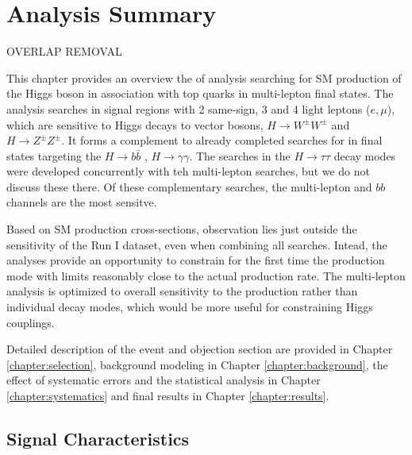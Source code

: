 \chapter[Analysis Summary][Analysis Summary]{Analysis Summary}
\label{chapter:analysis} 
OVERLAP REMOVAL

This chapter provides an overview the of analysis searching for SM
production of the Higgs boson in association with top quarks in
multi-lepton final states. The analysis searches in signal regions
with 2 same-sign, 3 and 4 light leptons ($e, \mu$), which are sensitive to Higgs
decays to vector bosons, $H\rightarrow W^{\pm}W^{\pm}$ and $H\rightarrow
Z^{\pm}Z^{\pm}$. It forms a complement to already completed searches for in
final states targeting the $H\rightarrow b\bar{b}$ \cite{Aad:2014lma},
$H\rightarrow\gamma\gamma$\cite{ATLAS-CONF-2014-011}. The \tth searches
in the $H\rightarrow\tau\tau$ decay modes were developed concurrently with teh 
multi-lepton searches, but we do not discuss these there. 
Of these complementary searches, the multi-lepton and $bb$ channels are the most sensitve. 

Based on SM production cross-sections, observation lies just outside the sensitivity
of the Run I dataset, even when combining all searches. Intead, the analyses provide an opportunity to 
constrain for the first time the \tth production mode with limits reasonably close to the
actual production rate. The multi-lepton analysis is optimized to overall sensitivity to the 
\tth production rather than individual decay modes, which would be more useful for
constraining Higgs couplings. 

Detailed description of the event and objection section are provided in Chapter \ref{chapter:selection},
background modeling in Chapter \ref{chapter:background}, the effect of systematic errors and the 
statistical analysis in Chapter \ref{chapter:systematics} and final results in Chapter \ref{chapter:results}.


\section{Signal Characteristics} 


